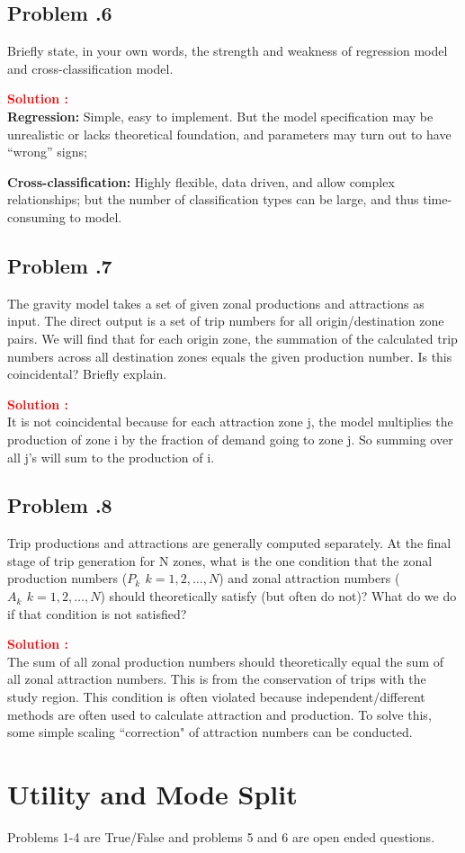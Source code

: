 \documentclass[12pt]{article}
\newcommand{\customsubsection}[1]{
  \subsection*{Problem \thesection.#1}
}
\begin{document}
\customsubsection{6}
Briefly state, in your own words, the strength and weakness of regression model and cross-classification model.


\textbf{\textcolor{red}{Solution :}} \\
\textbf{Regression:} Simple, easy to implement. But the model specification may be unrealistic or lacks theoretical foundation, and parameters may turn out to have “wrong” signs;

\textbf{Cross-classification:} Highly flexible, data driven, and allow complex relationships; but the number of classification types can be large, and thus time-consuming to model.

\newpage

\customsubsection{7}
The gravity model takes a set of given zonal productions and attractions as input. The direct output is a set of trip numbers for all origin/destination zone pairs.  We will find that for each origin zone, the summation of the calculated trip numbers across all destination zones equals the given production number. Is this coincidental? Briefly explain. 


\textbf{\textcolor{red}{Solution :}} \\
It is not coincidental because for each attraction zone j, the model multiplies the production of zone i by the fraction of demand going to zone j. So summing over all j’s will sum to the production of i.

\newpage


\customsubsection{8}
Trip productions and attractions are generally computed separately. At the final stage of trip generation for N zones, what is the one condition that the zonal production numbers ($P_k \,\ k=1,2,\hdots, N$) and zonal attraction numbers ($A_k \,\ k=1,2,\hdots, N$) should theoretically satisfy (but often do not)? What do we do if that condition is not satisfied?


\textbf{\textcolor{red}{Solution :}} \\
The sum of all zonal production numbers should theoretically equal the sum of all zonal attraction numbers. This is from the conservation of trips with the study region. This condition is often violated because independent/different methods are often used to calculate attraction and production. To solve this, some simple scaling ``correction" of attraction numbers can be conducted.

\newpage




\section{Utility and Mode Split}
Problems 1-4 are True/False and problems 5 and 6 are open ended questions.
\end{document}
